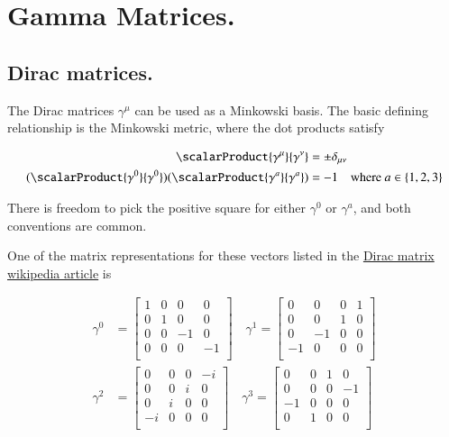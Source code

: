 \chapter{Gamma Matrices.}\label{chap:PJDiracGamma}
\date{ Dec 13, 2008.  Last Revision: $Date: 2009/06/04 13:13:27 $ }

\section{Dirac matrices. }

The Dirac matrices $\gamma^\mu$ can be used as a Minkowski basis.  The basic defining relationship is the Minkowski metric, where the dot products satisfy

\begin{align*}
\scalarProduct{\gamma^\mu}{\gamma^\nu} &= \pm \delta_{\mu\nu} \\
(\scalarProduct{\gamma^0}{\gamma^0})(\scalarProduct{\gamma^a}{\gamma^a}) &= -1 \quad \text{where $a \in \{1,2,3\}$}
\end{align*}

There is freedom to pick the positive square for either $\gamma^0$ or $\gamma^a$, and both conventions are common.

One of the matrix representations for these vectors listed in the 
\href{http://en.wikipedia.org/wiki/Gamma_matrices}{Dirac matrix wikipedia article}
is

\begin{align}\label{eqn:gamma:basis}
\gamma^0 &= \begin{bmatrix}
 1  &  0  &  0  &  0  \\
 0  &  1  &  0  &  0  \\
 0  &  0  &  -1  &  0  \\
 0  &  0  &  0  &  -1  \\
\end{bmatrix} \quad
\gamma^1 = \begin{bmatrix}
 0  &  0  &  0  &  1  \\
 0  &  0  &  1  &  0  \\
 0  &  -1  &  0  &  0  \\
 -1  &  0  &  0  &  0  \\
\end{bmatrix} \\
\gamma^2 &= \begin{bmatrix}
 0  &  0  &  0  &  -i  \\
 0  &  0  &  i  &  0  \\
 0  &  i  &  0  &  0  \\
 -i  &  0  &  0  &  0  \\
\end{bmatrix}
\quad \gamma^3 = \begin{bmatrix}
 0  &  0  &  1  &  0  \\
 0  &  0  &  0  &  -1  \\
 -1  &  0  &  0  &  0  \\
 0  &  1  &  0  &  0  \\
\end{bmatrix}
\end{align}

